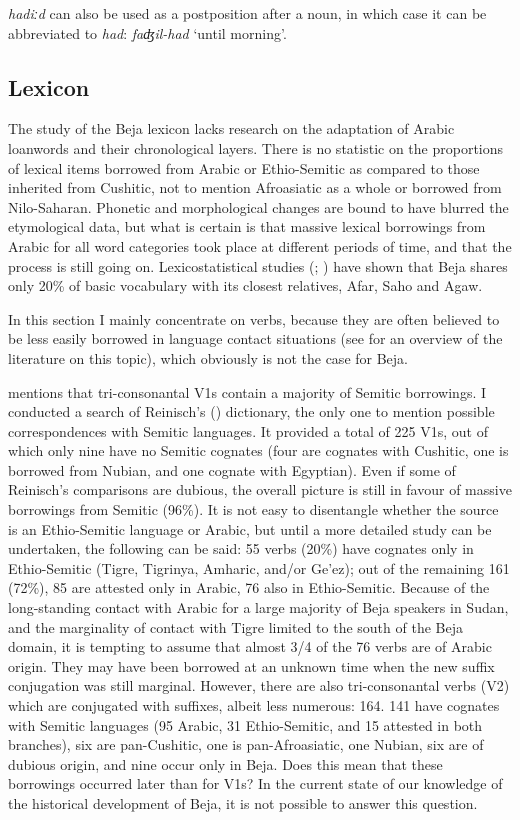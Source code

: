 \documentclass[output=paper]{langsci/langscibook}
\begin{document}
\textit{hadiːd} can also be used as a postposition after a noun, in which case it can be abbreviated to \textit{had}: \textit{faʤil-had} ‘until morning’.


 
 \subsection{Lexicon}


The study of the Beja lexicon lacks research on the adaptation of Arabic loanwords and their chronological layers. There is no statistic on the proportions of lexical items borrowed from Arabic or Ethio-Semitic as compared to those inherited from Cushitic, not to mention Afroasiatic as a whole or borrowed from Nilo-Saharan. Phonetic and morphological changes are bound to have blurred the etymological data, but what is certain is that massive lexical borrowings from Arabic for all word categories took place at different periods of time, and that the process is still going on. Lexicostatistical studies (\citealt[267]{Cohen1988}; \citealt{Blažek1997}) have shown that Beja shares only 20\% of basic vocabulary with its closest relatives, Afar, Saho and Agaw.

In this section I mainly concentrate on verbs, because they are often believed to be less  easily borrowed in language contact situations (see \citealt{Wohlgemuth2009} for an overview of the literature on this topic), which obviously is not the case for Beja.

\citet{Cohen1988} mentions that tri-consonantal V1s contain a majority of Semitic borrowings. I conducted a search of Reinisch's (\citeyear{Reinisch1895}) dictionary, the only one to mention possible correspondences with Semitic languages. It provided a total of 225 V1s, out of which only nine have no Semitic cognates (four are cognates with Cushitic, one is borrowed from Nubian, and one cognate with Egyptian). Even if some of Reinisch’s comparisons are dubious, the overall picture is still in favour of massive borrowings from Semitic (96\%). It is not easy to disentangle whether the source is an Ethio-Semitic language or Arabic, but until a more detailed study can be undertaken, the following can be said: 55 verbs (20\%) have cognates only in Ethio-Semitic (Tigre, Tigrinya, Amharic, and/or Ge’ez); out of the remaining 161 (72\%), 85 are attested only in Arabic, 76 also in Ethio-Semitic. Because of the long-standing contact with Arabic for a large majority of Beja speakers in Sudan, and the marginality of contact with Tigre limited to the south of the Beja domain, it is tempting to assume that almost 3/4 of the 76 verbs are of Arabic origin. They may have been borrowed at an unknown time when the new suffix conjugation was still marginal. However, there are also tri-consonantal verbs (V2) which are conjugated with suffixes, albeit less numerous: 164. 141 have cognates with Semitic languages (95 Arabic, 31 Ethio-Semitic, and 15 attested in both branches), six are pan-Cushitic, one is pan-Afroasiatic, one Nubian, six are of dubious origin, and nine occur only in Beja. Does this mean that these borrowings occurred later than for V1s? In the current state of our knowledge of the historical development of Beja, it is not possible to answer this question.
\end{document}
